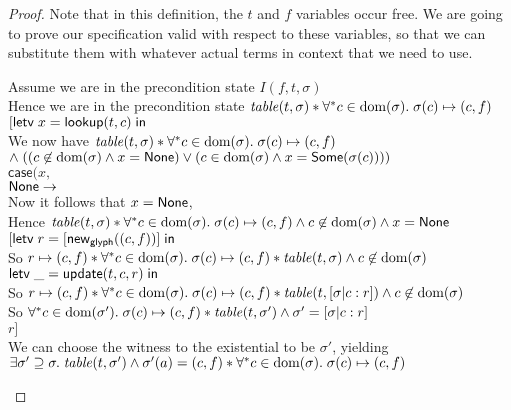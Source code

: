 \begin{proof}
Note that in this definition, the $t$ and $f$ variables occur free. We are going to 
prove our specification valid with respect to these variables, so that we can substitute
them with whatever actual terms in context that we need to use. 

\begin{tabbedproof}
\oo Assume we are in the precondition state $I(f, t, \sigma)$ \\
\oo Hence we are in the precondition state $\mathit{table}(t, \sigma) * \forall^{*}c \in \mbox{dom}({\sigma}).\;\sigma(c) \mapsto (c,f)$ \\
\oo $[\mathsf{letv}\;x = \mathsf{lookup}(t,c)\;\mathsf{in}\;$ \\
\oo We now have $\mathit{table}(t, \sigma) * \forall^{*}c \in \mbox{dom}({\sigma}).\;\sigma(c) \mapsto (c,f)$  \\
\ox $\land\; ((c \not \in \mbox{dom}({\sigma}) \land x = \mathsf{None}) \vee (c \in \mbox{dom}({\sigma}) \land x = \mathsf{Some}(\sigma(c))))$ \\
\oo $\mathsf{case}(x,$ \\
\ooo $\mathsf{None} \to$ \\
\oooo Now it follows that $x = \mathsf{None}$, \\
\oooo Hence $\mathit{table}(t, \sigma) * \forall^{*}c \in \mbox{dom}({\sigma}).\;\sigma(c) \mapsto (c,f) \land c \not \in \mbox{dom}({\sigma}) \land x = \mathsf{None}$\\
\oooo $[\mathsf{letv}\;r = [\mathsf{new}_{\mathsf{glyph}}((c,f))]\;\mathsf{in}\;$ \\
\oooo So $r \mapsto (c,f) * \forall^{*}c \in \mbox{dom}({\sigma}).\;\sigma(c) \mapsto (c,f) * \mathit{table}(t, \sigma) \land c \not \in \mbox{dom}({\sigma})$\\
\oooo $\mathsf{letv}\;\_ = \mathsf{update}(t, c, r)\;\mathsf{in}\;$ \\
\oooo So $r \mapsto (c,f) * \forall^{*}c \in \mbox{dom}({\sigma}).\;\sigma(c) \mapsto (c,f) * \mathit{table}(t, [\sigma|c:r]) \land c \not \in \mbox{dom}({\sigma})$\\
\oooo So $\forall^{*}c \in \mbox{dom}({\sigma'}).\;\sigma(c) \mapsto (c,f) * \mathit{table}(t, \sigma') \land \sigma' = [\sigma|c:r]$\\
\oooo $r]$ \\
\oooo We can choose the witness to the existential to be $\sigma'$, yielding \\
\ooox $\exists \sigma' \supseteq \sigma.\; \mathit{table}(t, \sigma') \land \sigma'(a) = (c,f) * \forall^{*}c \in \mbox{dom}({\sigma}).\;\sigma(c) \mapsto (c,f)$ \\

\end{tabbedproof}
\end{proof}
